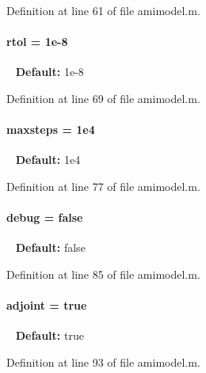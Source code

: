 Definition at line 61 of file amimodel.\+m.

\hypertarget{classamimodel_a7978e9a4674f869e6b2950e2f6262ca5}{}
\paragraph[{rtol}]{\setlength{\rightskip}{0pt plus 5cm}rtol = 1e-\/8}\label{classamimodel_a7978e9a4674f869e6b2950e2f6262ca5}
~\newline
{\bfseries Default\+:} 1e-\/8 

Definition at line 69 of file amimodel.\+m.

\hypertarget{classamimodel_ac37622882dacee1f11688d4941ccb45e}{}
\paragraph[{maxsteps}]{\setlength{\rightskip}{0pt plus 5cm}maxsteps = 1e4}\label{classamimodel_ac37622882dacee1f11688d4941ccb45e}
~\newline
{\bfseries Default\+:} 1e4 

Definition at line 77 of file amimodel.\+m.

\hypertarget{classamimodel_a0514aabed091ee5e2f35766eb01eced6}{}
\paragraph[{debug}]{\setlength{\rightskip}{0pt plus 5cm}debug = false}\label{classamimodel_a0514aabed091ee5e2f35766eb01eced6}
~\newline
{\bfseries Default\+:} false 

Definition at line 85 of file amimodel.\+m.

\hypertarget{classamimodel_ab6d500b41cf50693452415caca31d32e}{}
\paragraph[{adjoint}]{\setlength{\rightskip}{0pt plus 5cm}adjoint = true}\label{classamimodel_ab6d500b41cf50693452415caca31d32e}
~\newline
{\bfseries Default\+:} true 

Definition at line 93 of file amimodel.\+m.

